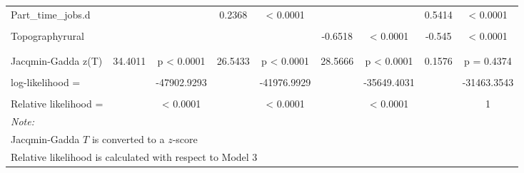 \documentclass[smallextended]{svjour3}       %
\begin{document}
\begin{landscape}
\begin{table}
{\begin{tabular}[t]{lcccccccc}
Part\_time\_jobs.d &  &  & 0.2368 & < 0.0001 &  &  & 0.5414 & < 0.0001\\
\cellcolor{gray!6}{Topographylower city - rural} & \cellcolor{gray!6}{} & \cellcolor{gray!6}{} & \cellcolor{gray!6}{} & \cellcolor{gray!6}{} & \cellcolor{gray!6}{-2.53} & \cellcolor{gray!6}{< 0.0001} & \cellcolor{gray!6}{-2.4021} & \cellcolor{gray!6}{< 0.0001}\\
Topographyrural &  &  &  &  & -0.6518 & < 0.0001 & -0.545 & < 0.0001\\
\cellcolor{gray!6}{quietest\_distance} & \cellcolor{gray!6}{} & \cellcolor{gray!6}{} & \cellcolor{gray!6}{} & \cellcolor{gray!6}{} & \cellcolor{gray!6}{-0.3253} & \cellcolor{gray!6}{< 0.0001} & \cellcolor{gray!6}{-0.345} & \cellcolor{gray!6}{< 0.0001}\\
\addlinespace[2em]
\multicolumn{9}{l}{\textbf{Model diagnostics}}\\
\hspace{1em}Jacqmin-Gadda z(T) & 34.4011 & p < 0.0001 & 26.5433 & p < 0.0001 & 28.5666 & p < 0.0001 & 0.1576 & p =  0.4374\\
\cellcolor{gray!6}{n =} & \cellcolor{gray!6}{} & \cellcolor{gray!6}{9801} & \cellcolor{gray!6}{} & \cellcolor{gray!6}{9801} & \cellcolor{gray!6}{} & \cellcolor{gray!6}{9801} & \cellcolor{gray!6}{} & \cellcolor{gray!6}{9801}\\
\hspace{1em}log-likelihood = &  & -47902.9293 &  & -41976.9929 &  & -35649.4031 &  & -31463.3543\\
\cellcolor{gray!6}{AIC =} & \cellcolor{gray!6}{} & \cellcolor{gray!6}{95807.8587} & \cellcolor{gray!6}{} & \cellcolor{gray!6}{83993.9858} & \cellcolor{gray!6}{} & \cellcolor{gray!6}{71306.8063} & \cellcolor{gray!6}{} & \cellcolor{gray!6}{62972.7087}\\
\hspace{1em}Relative likelihood = &  & < 0.0001 &  & < 0.0001 &  & < 0.0001 &  & 1\\
\bottomrule
\multicolumn{9}{l}{\rule{0pt}{1em}\textit{Note: }}\\
\multicolumn{9}{l}{\rule{0pt}{1em}Jacqmin-Gadda $T$ is converted to a $z$-score}\\
\multicolumn{9}{l}{\rule{0pt}{1em}Relative likelihood is calculated with respect to Model 3}\\
\end{tabular}}
\end{table}
\end{landscape}
\end{document}
